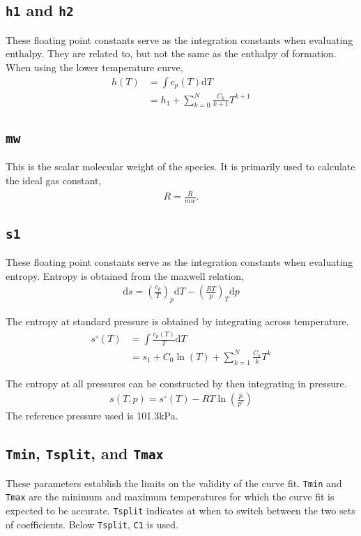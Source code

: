 \subsection{\texttt{h1} and \texttt{h2}}
These floating point constants serve as the integration constants when evaluating enthalpy.  They are related to, but not the same as the enthalpy of formation.  When using the lower temperature curve,
\begin{align}
h(T) &= \int c_p(T) \mathrm{d} T \nonumber\\
     &= h_1 + \sum_{k=0}^N \frac{C_k}{k+1} T^{k+1}
\end{align}


\subsection{\texttt{mw}}
This is the scalar molecular weight of the species.  It is primarily used to calculate the ideal gas constant,
\begin{align}
R = \frac{\overline{R}}{mw}.
\end{align}


\subsection{\texttt{s1}}
These floating point constants serve as the integration constants when evaluating entropy.  Entropy is obtained from the maxwell relation,
\begin{align}
\mathrm{d}s = \left(\frac{c_p}{T}\right)_p \mathrm{d}T - \left(\frac{R T}{p}\right)_T\mathrm{d}p
\end{align}

The entropy at standard pressure is obtained by integrating across temperature.
\begin{align}
s^\circ(T) &= \int \frac{c_p(T)}{T} \mathrm{d} T\nonumber\\
       &= s_1 + C_0 \ln(T) + \sum_{k=1}^N \frac{C_k}{k} T^k
\end{align}

The entropy at all pressures can be constructed by then integrating in pressure.
\begin{align}
s(T,p) = s^\circ(T) - R T \ln\left(\frac{p}{p^\circ}\right)
\end{align}
The reference pressure used is 101.3kPa.

\subsection{\texttt{Tmin}, \texttt{Tsplit}, and \texttt{Tmax}}
These parameters establish the limits on the validity of the curve fit.  \verb|Tmin| and \verb|Tmax| are the minimum and maximum temperatures for which the curve fit is expected to be accurate.  \verb|Tsplit| indicates at when to switch between the two sets of coefficients.  Below \verb|Tsplit|, \verb|C1| is used.

